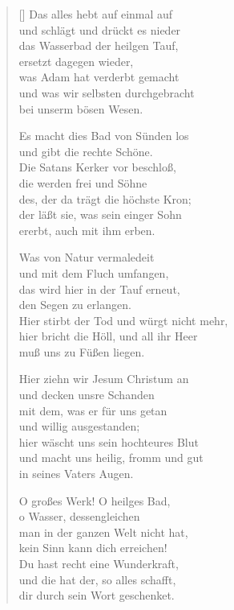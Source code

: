 \begin{multicols}{2}
\begin{verse}[\versewidth]
 Das alles hebt auf einmal auf\\
und schlägt und drückt es nieder\\
das Wasserbad der heilgen Tauf,\\
ersetzt dagegen wieder,\\
was Adam hat verderbt gemacht\\
und was wir selbsten durchgebracht\\
bei unserm bösen Wesen.

 Es macht dies Bad von Sünden los\\
und gibt die rechte Schöne.\\
Die Satans Kerker vor beschloß,\\
die werden frei und Söhne\\
des, der da trägt die höchste Kron;\\
der läßt sie, was sein einger Sohn\\
ererbt, auch mit ihm erben.

 Was von Natur vermaledeit\\
und mit dem Fluch umfangen,\\
das wird hier in der Tauf erneut,\\
den Segen zu erlangen.\\
Hier stirbt der Tod und würgt nicht mehr,\\
hier bricht die Höll, und all ihr Heer\\
muß uns zu Füßen liegen.

 Hier ziehn wir Jesum Christum an\\
und decken unsre Schanden\\
mit dem, was er für uns getan\\
und willig ausgestanden;\\
hier wäscht uns sein hochteures Blut\\
und macht uns heilig, fromm und gut\\
in seines Vaters Augen.

 O großes Werk! O heilges Bad,\\
o Wasser, dessengleichen\\
man in der ganzen Welt nicht hat,\\
kein Sinn kann dich erreichen!\\
Du hast recht eine Wunderkraft,\\
und die hat der, so alles schafft,\\
dir durch sein Wort geschenket.


\end{verse}
\end{multicols}
